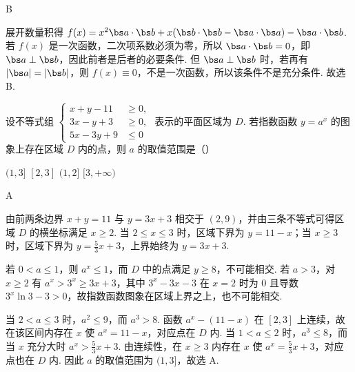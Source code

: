 \begin{answer}
B
\end{answer}

\begin{solution}
展开数量积得 \(f(x)=x^{2}\bs a\cdot\bs b+x(\bs b\cdot\bs b-\bs a\cdot\bs a)-\bs a\cdot\bs b\). 若 \(f(x)\) 是一次函数，二次项系数必须为零，所以 \(\bs a\cdot\bs b=0\)，即 \(\bs a\perp\bs b\)，因此前者是后者的必要条件. 但 \(\bs a\perp\bs b\) 时，若再有 \(\lvert\bs a\rvert=\lvert\bs b\rvert\)，则 \(f(x)\equiv0\)，不是一次函数，所以该条件不是充分条件. 故选 B.
\end{solution}

\begin{problem}
设不等式组 \( \left\{\begin{aligned}x+y-11&\geqslant0,\\ 3x-y+3&\geqslant0,\\ 5x-3y+9&\leqslant0\end{aligned}\right. \) 表示的平面区域为 \(D\). 若指数函数 \( y=a^{x} \) 的图象上存在区域 \(D\) 内的点，则 \(a\) 的取值范围是（\quad）

\choices
    {\((1,3]\)}
    {\([2,3]\)}
    {\((1,2]\)}
    {\([3, +\infty)\)}
\end{problem}

\begin{answer}
A
\end{answer}

\begin{solution}
由前两条边界 \(x+y=11\) 与 \(y=3x+3\) 相交于 \((2,9)\)，并由三条不等式可得区域 \(D\) 的横坐标满足 \(x\geqslant2\). 当 \(2\leqslant x\leqslant3\) 时，区域下界为 \(y=11-x\)；当 \(x\geqslant3\) 时，区域下界为 \(y=\frac{5}{3}x+3\)，上界始终为 \(y=3x+3\).

若 \(0<a\leqslant1\)，则 \(a^{x}\leqslant1\)，而 \(D\) 中的点满足 \(y\geqslant8\)，不可能相交. 若 \(a>3\)，对 \(x\geqslant2\) 有 \(a^{x}>3^{x}\geqslant3x+3\)，其中 \(3^{x}-3x-3\) 在 \(x=2\) 时为 0 且导数 \(3^{x}\ln3-3>0\)，故指数函数图象在区域上界之上，也不可能相交.

当 \(2<a\leqslant3\) 时，\(a^{2}\leqslant9\)，而 \(a^{3}>8\). 函数 \(a^{x}-(11-x)\) 在 \([2,3]\) 上连续，故在该区间内存在 \(x\) 使 \(a^{x}=11-x\)，对应点在 \(D\) 内. 当 \(1<a\leqslant2\) 时，\(a^{3}\leqslant8\)，而当 \(x\) 充分大时 \(a^{x}>\frac{5}{3}x+3\). 由连续性，在 \(x\geqslant3\) 内存在 \(x\) 使 \(a^{x}=\frac{5}{3}x+3\)，对应点也在 \(D\) 内. 因此 \(a\) 的取值范围为 \((1,3]\)，故选 A.
\end{solution}


